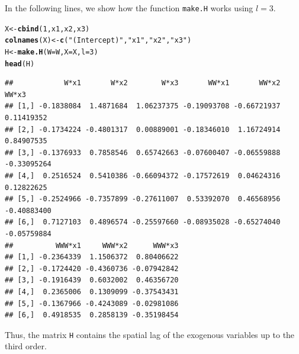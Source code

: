 \documentclass[english,12pt]{book}\usepackage[]{graphicx}\usepackage[]{xcolor}
\makeatletter
\newcommand{\hlnum}[1]{\textcolor[rgb]{0.686,0.059,0.569}{#1}}%
\newcommand{\hlsng}[1]{\textcolor[rgb]{0.192,0.494,0.8}{#1}}%
\newcommand{\hldef}[1]{\textcolor[rgb]{0.345,0.345,0.345}{#1}}%
\newcommand{\hlkwb}[1]{\textcolor[rgb]{0.69,0.353,0.396}{#1}}%
\newcommand{\hlkwc}[1]{\textcolor[rgb]{0.333,0.667,0.333}{#1}}%
\newcommand{\hlkwd}[1]{\textcolor[rgb]{0.737,0.353,0.396}{\textbf{#1}}}%
\newenvironment{kframe}{%
 \def\at@end@of@kframe{}%
 \ifinner\ifhmode%
  \def\at@end@of@kframe{\end{minipage}}%
  \begin{minipage}{\columnwidth}%
 \fi\fi%
 \def\FrameCommand##1{\hskip\@totalleftmargin \hskip-\fboxsep
 \colorbox{shadecolor}{##1}\hskip-\fboxsep
     \hskip-\linewidth \hskip-\@totalleftmargin \hskip\columnwidth}%
 \MakeFramed {\advance\hsize-\width
   \@totalleftmargin\z@ \linewidth\hsize
   \@setminipage}}%
 {\par\unskip\endMakeFramed%
 \at@end@of@kframe}
\newenvironment{knitrout}{}{} %
\makeatother
\begin{document}
In the following lines, we show how the function \texttt{make.H} works using $l = 3$. 
\begin{knitrout}
\color{fgcolor}\begin{kframe}
\begin{alltt}
\hldef{X} \hlkwb{<-} \hlkwd{cbind}\hldef{(}\hlnum{1}\hldef{, x1, x2, x3)}
\hlkwd{colnames}\hldef{(X)} \hlkwb{<-} \hlkwd{c}\hldef{(}\hlsng{"(Intercept)"}\hldef{,} \hlsng{"x1"}\hldef{,} \hlsng{"x2"}\hldef{,} \hlsng{"x3"}\hldef{)}
\hldef{H} \hlkwb{<-} \hlkwd{make.H}\hldef{(}\hlkwc{W} \hldef{= W,} \hlkwc{X} \hldef{= X,} \hlkwc{l} \hldef{=} \hlnum{3}\hldef{)}
\hlkwd{head}\hldef{(H)}
\end{alltt}
\begin{verbatim}
##            W*x1       W*x2        W*x3       WW*x1       WW*x2       WW*x3
## [1,] -0.1838084  1.4871684  1.06237375 -0.19093708 -0.66721937  0.11419352
## [2,] -0.1734224 -0.4801317  0.00889001 -0.18346010  1.16724914  0.84907535
## [3,] -0.1376933  0.7858546  0.65742663 -0.07600407 -0.06559888 -0.33095264
## [4,]  0.2516524  0.5410386 -0.66094372 -0.17572619  0.04624316  0.12822625
## [5,] -0.2524966 -0.7357899 -0.27611007  0.53392070  0.46568956 -0.40883400
## [6,]  0.7127103  0.4896574 -0.25597660 -0.08935028 -0.65274040 -0.05759884
##          WWW*x1     WWW*x2      WWW*x3
## [1,] -0.2364339  1.1506372  0.80406622
## [2,] -0.1724420 -0.4360736 -0.07942842
## [3,] -0.1916439  0.6032002  0.46356720
## [4,]  0.2365006  0.1309099 -0.37543431
## [5,] -0.1367966 -0.4243089 -0.02981086
## [6,]  0.4918535  0.2858139 -0.35198454
\end{verbatim}
\end{kframe}
\end{knitrout}

Thus, the matrix \texttt{H} contains the spatial lag of the exogenous variables up to the third order. 
\end{document}
